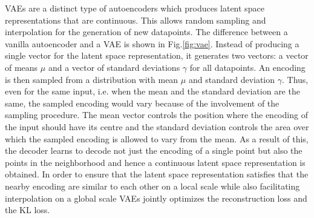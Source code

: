 \vspace{5mm}

\ac{VAE}s are a distinct type of autoencoders which produces latent space representations that are continuous. This allows random sampling and interpolation for the generation of new datapoints. The difference between a vanilla autoencoder and a \ac*{VAE} is shown in Fig.\ref{fig:vae}. Instead of producing a single vector for the latent space representation, it generates two vectors: a vector of means $\mu$ and a vector of standard deviations $\gamma$ for all datapoints. An encoding is then sampled from a distribution with mean $\mu$ and standard deviation $\gamma$. Thus, even for the same input, i.e. when the mean and the standard deviation are the same, the sampled encoding would vary because of the involvement of the sampling procedure. The mean vector controls the position where the encoding of the input should have its centre and the standard deviation controls the area over which the sampled encoding is allowed to vary from the mean. As a result of this, the decoder learns to decode not just the encoding of a single point but also the points in the neighborhood and hence a continuous latent space representation is obtained. In order to ensure that the latent space representation satisfies that the nearby encoding are similar to each other on a local scale while also facilitating interpolation on a global scale \ac{VAE}s jointly optimizes the reconstruction loss and the \ac*{KL}\cite{kullback1951information} loss.\cite{kingma2019introduction,vae}

